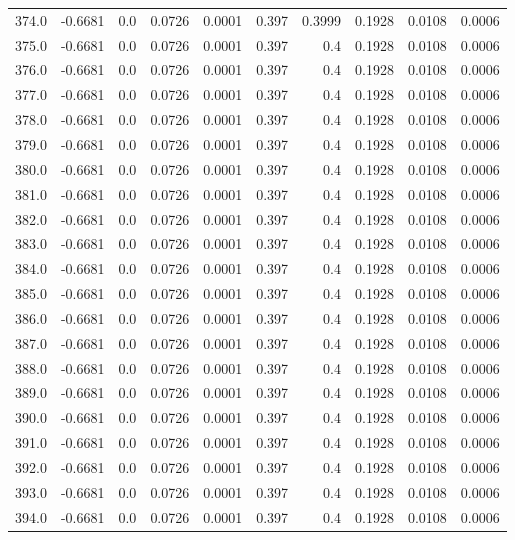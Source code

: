 \begin{longtable}{lrrrrrrrrr}
374.0 & -0.6681 & 0.0 & 0.0726 & 0.0001 & 0.397 & 0.3999 & 0.1928 & 0.0108 & 0.0006 \\
375.0 & -0.6681 & 0.0 & 0.0726 & 0.0001 & 0.397 & 0.4 & 0.1928 & 0.0108 & 0.0006 \\
376.0 & -0.6681 & 0.0 & 0.0726 & 0.0001 & 0.397 & 0.4 & 0.1928 & 0.0108 & 0.0006 \\
377.0 & -0.6681 & 0.0 & 0.0726 & 0.0001 & 0.397 & 0.4 & 0.1928 & 0.0108 & 0.0006 \\
378.0 & -0.6681 & 0.0 & 0.0726 & 0.0001 & 0.397 & 0.4 & 0.1928 & 0.0108 & 0.0006 \\
379.0 & -0.6681 & 0.0 & 0.0726 & 0.0001 & 0.397 & 0.4 & 0.1928 & 0.0108 & 0.0006 \\
380.0 & -0.6681 & 0.0 & 0.0726 & 0.0001 & 0.397 & 0.4 & 0.1928 & 0.0108 & 0.0006 \\
381.0 & -0.6681 & 0.0 & 0.0726 & 0.0001 & 0.397 & 0.4 & 0.1928 & 0.0108 & 0.0006 \\
382.0 & -0.6681 & 0.0 & 0.0726 & 0.0001 & 0.397 & 0.4 & 0.1928 & 0.0108 & 0.0006 \\
383.0 & -0.6681 & 0.0 & 0.0726 & 0.0001 & 0.397 & 0.4 & 0.1928 & 0.0108 & 0.0006 \\
384.0 & -0.6681 & 0.0 & 0.0726 & 0.0001 & 0.397 & 0.4 & 0.1928 & 0.0108 & 0.0006 \\
385.0 & -0.6681 & 0.0 & 0.0726 & 0.0001 & 0.397 & 0.4 & 0.1928 & 0.0108 & 0.0006 \\
386.0 & -0.6681 & 0.0 & 0.0726 & 0.0001 & 0.397 & 0.4 & 0.1928 & 0.0108 & 0.0006 \\
387.0 & -0.6681 & 0.0 & 0.0726 & 0.0001 & 0.397 & 0.4 & 0.1928 & 0.0108 & 0.0006 \\
388.0 & -0.6681 & 0.0 & 0.0726 & 0.0001 & 0.397 & 0.4 & 0.1928 & 0.0108 & 0.0006 \\
389.0 & -0.6681 & 0.0 & 0.0726 & 0.0001 & 0.397 & 0.4 & 0.1928 & 0.0108 & 0.0006 \\
390.0 & -0.6681 & 0.0 & 0.0726 & 0.0001 & 0.397 & 0.4 & 0.1928 & 0.0108 & 0.0006 \\
391.0 & -0.6681 & 0.0 & 0.0726 & 0.0001 & 0.397 & 0.4 & 0.1928 & 0.0108 & 0.0006 \\
392.0 & -0.6681 & 0.0 & 0.0726 & 0.0001 & 0.397 & 0.4 & 0.1928 & 0.0108 & 0.0006 \\
393.0 & -0.6681 & 0.0 & 0.0726 & 0.0001 & 0.397 & 0.4 & 0.1928 & 0.0108 & 0.0006 \\
394.0 & -0.6681 & 0.0 & 0.0726 & 0.0001 & 0.397 & 0.4 & 0.1928 & 0.0108 & 0.0006 \\

\end{longtable}
